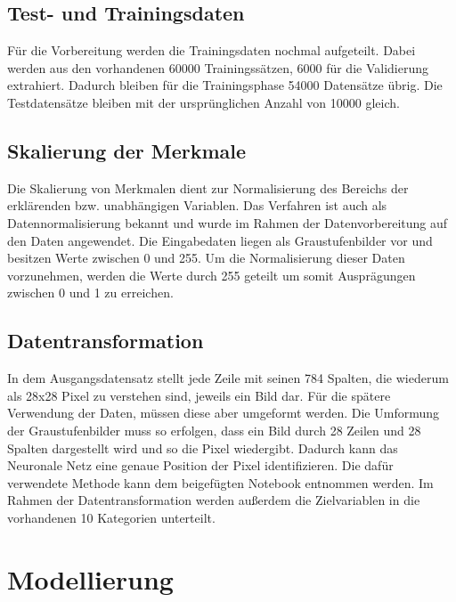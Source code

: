 \documentclass[12pt]{scrreprt}
\begin{document}
\subsection{Test- und Trainingsdaten}
Für die Vorbereitung werden die Trainingsdaten nochmal aufgeteilt. Dabei werden aus den vorhandenen 60000 Trainingssätzen, 6000 für die Validierung extrahiert. Dadurch bleiben für die Trainingsphase 54000 Datensätze übrig. Die Testdatensätze bleiben mit der ursprünglichen Anzahl von 10000 gleich.
	
\subsection{Skalierung der Merkmale}
	
Die Skalierung von Merkmalen dient zur Normalisierung des Bereichs der erklärenden bzw. unabhängigen Variablen. Das Verfahren ist auch als Datennormalisierung bekannt und wurde im Rahmen der Datenvorbereitung auf den Daten angewendet. Die Eingabedaten liegen als Graustufenbilder vor und besitzen Werte zwischen 0 und 255. Um die Normalisierung dieser Daten vorzunehmen, werden die Werte durch 255 geteilt um somit Ausprägungen zwischen 0 und 1 zu erreichen. 
	
\subsection{Datentransformation}
	
In dem Ausgangsdatensatz stellt jede Zeile mit seinen 784 Spalten, die wiederum als 28x28 Pixel zu verstehen sind, jeweils ein Bild dar. Für die spätere Verwendung der Daten, müssen diese aber umgeformt werden. Die Umformung der Graustufenbilder muss so erfolgen, dass ein Bild durch 28 Zeilen und 28 Spalten dargestellt wird und so die Pixel wiedergibt. Dadurch kann das Neuronale Netz eine genaue Position der Pixel identifizieren. Die dafür verwendete Methode kann dem beigefügten Notebook entnommen werden. Im Rahmen der Datentransformation werden außerdem die Zielvariablen in die vorhandenen 10 Kategorien unterteilt.
	
\section{Modellierung}\label{model:model}
	
\end{document}
